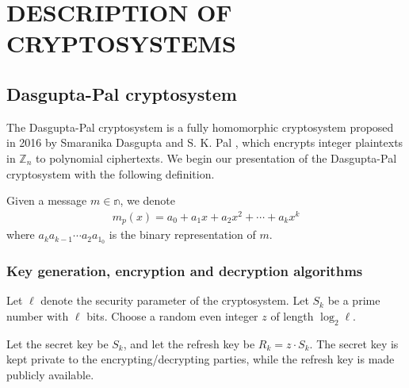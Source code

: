 

\chapter{DESCRIPTION OF CRYPTOSYSTEMS}

\section{Dasgupta-Pal cryptosystem}
The Dasgupta-Pal cryptosystem is a fully homomorphic cryptosystem proposed in 2016 by Smaranika Dasgupta and S. K. Pal \cite{dasgupta_design_2016}, which encrypts integer plaintexts in $\mathbb{Z}_n$ to polynomial ciphertexts. We begin our presentation of the Dasgupta-Pal cryptosystem with the following definition.

Given a message $m \in \mathbb{n}$, we denote
\begin{align*}
		m_p(x) = a_0 + a_1x + a_2x^2 + \cdots + a_kx^k
\end{align*}
where $a_ka_{k-1}\cdots a_2a_1_0$ is the binary representation of $m$.
\subsection{Key generation, encryption and decryption algorithms}
Let $\ell$ denote the security parameter of the cryptosystem.
Let $S_k$ be a prime number with $\ell$ bits.
Choose a random even integer $z$ of length $\log_2{\ell}$.

Let the secret key be $S_k$, and let the refresh key be $R_k = z \cdot S_k$. The secret key is kept private to the encrypting/decrypting parties, while the refresh key is made publicly available.

